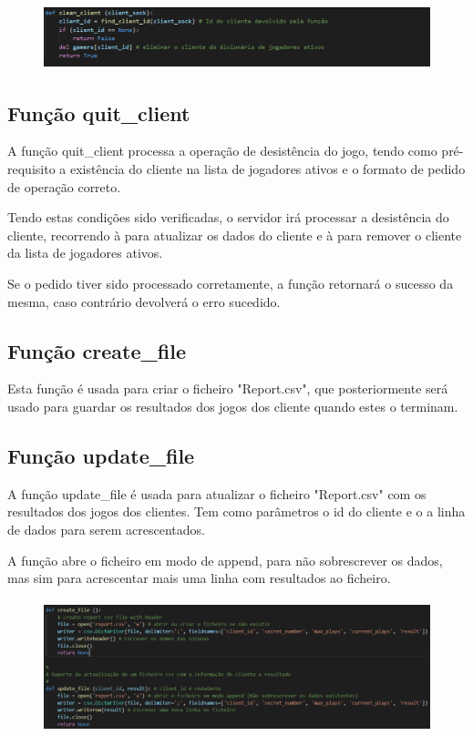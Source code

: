 \documentclass{report}
\begin{document}
\begin{figure}[!h]
\center
\includegraphics[height = 53pt]{img/cleanclient.png}
\end{figure}

\subsection{Função quit\_client}
\label{ssec:func_quit_client}

A função quit\_client processa a operação de desistência do jogo, tendo como pré-requisito a existência do cliente na lista de jogadores ativos e o formato de pedido de operação correto.

Tendo estas condições sido verificadas, o servidor irá processar a desistência do cliente, recorrendo à  para atualizar os dados do cliente e à  para remover o cliente da lista de jogadores ativos.

Se o pedido tiver sido processado corretamente, a função retornará o sucesso da mesma, caso contrário devolverá o erro sucedido.

\subsection{Função create\_file}
\label{ssec:func_create_file}

Esta função é usada para criar o ficheiro "Report.csv", que posteriormente será usado para guardar os resultados dos jogos dos cliente quando estes o terminam.

\subsection{Função update\_file}
\label{ssec:func_update_file}

A função update\_file é usada para atualizar o ficheiro "Report.csv" com os resultados dos jogos dos clientes. Tem como parâmetros o id do cliente e o a linha de dados para serem acrescentados.

A função abre o ficheiro em modo de append, para não sobrescrever os dados, mas sim para acrescentar mais uma linha com resultados ao ficheiro.

\begin{figure}[!h]
\center
\includegraphics[height = 110pt]{img/createupdate.png}
\end{figure}
\end{document}
